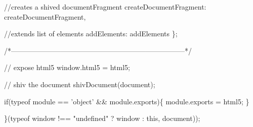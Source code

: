 \begin{DoxyCodeInclude}
    \textcolor{comment}{//creates a shived documentFragment}
    createDocumentFragment: createDocumentFragment,

    \textcolor{comment}{//extends list of elements}
    addElements: addElements
  \};

  \textcolor{comment}{/*--------------------------------------------------------------------------*/}

  \textcolor{comment}{// expose html5}
  window.html5 = html5;

  \textcolor{comment}{// shiv the document}
  shivDocument(document);

  \textcolor{keywordflow}{if}(typeof module == \textcolor{stringliteral}{'object'} && module.exports)\{
    module.exports = html5;
  \}

\}(typeof window !== \textcolor{stringliteral}{"undefined"} ? window : \textcolor{keyword}{this}, document));
\end{DoxyCodeInclude}
 